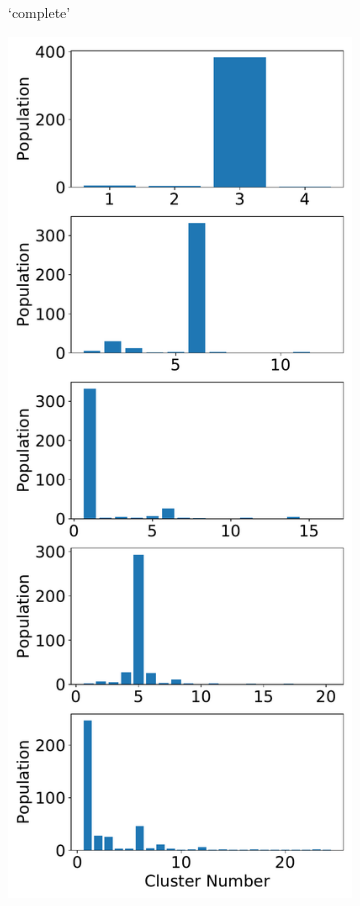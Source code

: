 \documentclass{article}
\begin{document}
\begin{figure}
\begin{subfigure}{0.24\textwidth}
  \caption{`complete'}\label{fig:silhouette_URE}
  \end{subfigure}
  \begin{subfigure}{0.24\textwidth}
  \includegraphics[width=\textwidth]{nclusters_average.pdf}

\end{subfigure}
\end{figure}
\end{document}
